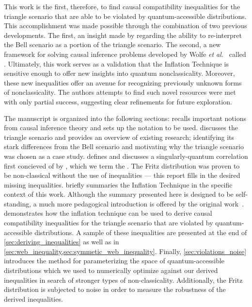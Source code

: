 \documentclass[aps, 10pt, english, twoside, pra, nofootinbib, tightenlines, longbibliography]{revtex4-1}
\begin{document}
    This work is the first, therefore, to find causal compatibility inequalities for the triangle scenario that are able to be violated by quantum-accessible distributions. This accomplishment was made possible through the combination of two previous developments. The first, an insight made by \citet{Fritz_2012} regarding the ability to re-interpret the Bell scenario as a portion of the triangle scenario. The second, a new framework for solving causal inference problems developed by Wolfe \emph{et al.}~\cite{Inflation} called . Ultimately, this work serves as a validation that the Inflation Technique is sensitive enough to offer new insights into quantum nonclassicality. Moreover, these new inequalities offer an avenue for recognizing previously unknown forms of nonclassicality. The authors attempts to find such novel resources were met with only partial success, suggesting clear refinements for future exploration.

    The manuscript is organized into the following sections:  recalls important notions from causal inference theory and sets up the notation to be used.  discusses the triangle scenario and provides an overview of existing research; identifying its stark differences from the Bell scenario and motivating why the triangle scenario was chosen as a case study.  defines and discusses a singularly-quantum correlation first concieved of by \citet{Fritz_2012}, which we term the . The Fritz distribution was proven to be non-classical without the use of inequalities --- this report fills in the desired missing inequalities.  briefly summaries the Inflation Technique in the specific context of this work. Although the summary presented here is designed to be self-standing, a much more pedagogical introduction is offered by the original work~\cite{Inflation}.  demonstrates how the inflation technique can be used to derive causal compatibility inequalities for the triangle scenario that are violated by quantum-accessible distributions. A sample of these inequalities are presented at the end of \cref{sec:deriving_inequalities} as well as in \cref{sec:web_inequality,sec:symmetic_web_inequality}. Finally, \cref{sec:violations_noise} introduces the method for parameterizing the space of quantum-accessible distributions which we used to numerically optimize against our derived inequalities in search of stronger types of non-classicality. Additionally, the Fritz distribution is subjected to noise in order to measure the robustness of the derived inequalities.
   
\end{document}
